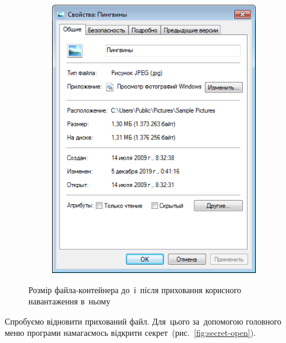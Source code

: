 \documentclass[
	a4paper,
	oneside,
	BCOR = 10mm,
	DIV = 12,
	12pt,
	headings = normal,
]{scrartcl}
\newlength{\gridunitwidth}
\begin{document}
\begin{figure}[!htbp]
\begin{subfigure}[b]{6 \gridunitwidth - 1em / (2-1)}
				\includegraphics[width = \columnwidth]{./assets/p19.png}
				\caption{}
				\label{subfig:size-cmp-after}
			\end{subfigure}
			\caption{Розмір файла-контейнера до~і~після приховання корисного навантаження в~ньому}
			\label{fig:size-cmp}
		\end{figure}

		Спробуємо відновити прихований файл. Для~цього за~допомогою головного меню програми намагаємось відкрити секрет~(рис.~\ref{fig:secret-open}).
\end{document}
